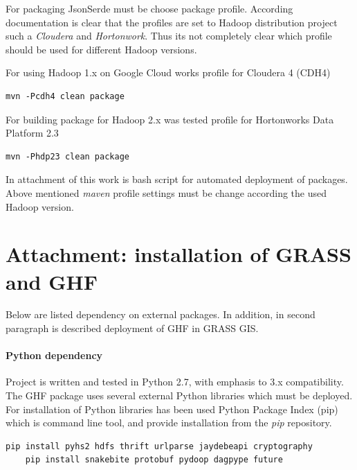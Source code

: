 \documentclass[a4paper,12pt,oneside]{report}
\begin{document}
	For packaging JsonSerde 
	must be choose package profile. According documentation is clear that the
	profiles are set to Hadoop distribution project such a \textit{Cloudera} and
	\textit{Hortonwork}. Thus its not completely clear which profile should be used
	for different Hadoop versions. 
	
	For using Hadoop 1.x on Google Cloud works profile for Cloudera 4 (CDH4)
	\begin{footnotesize}
		\begin{lstlisting}[style=python]
mvn -Pcdh4 clean package
		\end{lstlisting}
	\end{footnotesize}
	For building package for Hadoop 2.x was tested profile for Hortonworks Data
	Platform 2.3
	\begin{footnotesize}
		\begin{lstlisting}[style=python]
mvn -Phdp23 clean package
		\end{lstlisting}
	\end{footnotesize}
	
	In attachment of this work is bash script for automated deployment of packages.
	Above mentioned \textit{maven} profile settings must be change according the
	used Hadoop version.
	
	
	
	
\section{Attachment: installation of GRASS and GHF}
	\label{grass_install}
		
		Below are listed  dependency on external packages. In addition, in second
		paragraph is described deployment of GHF in GRASS GIS. 
		\paragraph{Python dependency}
		Project is written and tested in Python 2.7, with emphasis to 3.x compatibility.
		The GHF package uses several external Python libraries which must be deployed. For
		installation of Python libraries has been used Python Package Index (pip) which
		is command line tool, and provide installation from the \textit{pip} repository.
		\begin{footnotesize}
			\begin{lstlisting}[style=python]
	pip install pyhs2 hdfs thrift urlparse jaydebeapi cryptography
	pip install snakebite protobuf pydoop dagpype future
			\end{lstlisting}
		\end{footnotesize}
		
\end{document}
